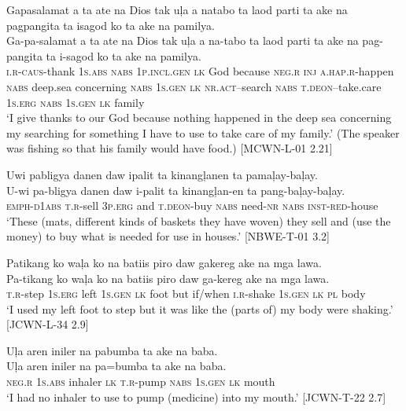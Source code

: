 \ea
Gapasalamat	a	ta	ate	na	Dios	tak	uļa a	natabo	ta	laod	parti	ta	ake	na	pagpangita ta	isagod	ko	ta	ake	na	pamilya. \\\smallskip
\gll Ga-pa-salamat	a	ta	ate	na	Dios	tak	uļa a	na-tabo	ta	laod	parti	ta	ake	na	pag-pangita ta	i-sagod	ko	ta	ake	na	pamilya. \\
\textsc{i.r}-\textsc{caus}-thank	1\textsc{s.abs}	\textsc{nabs}	1\textsc{p.incl.gen}	\textsc{lk}	God	because	\textsc{neg.r} \textsc{inj}	\textsc{a.hap.r}-happen	\textsc{nabs}	deep.sea	concerning	\textsc{nabs}	1\textsc{s.gen}	\textsc{lk}	\textsc{nr.act}–search \textsc{nabs}	\textsc{t.deon}–take.care	1\textsc{s.erg}	\textsc{nabs}	1\textsc{s.gen}	\textsc{lk}	family \\
\glt `I give thanks to our God because nothing happened in the deep sea concerning my searching for something I have to use to take care of my family.’ (The speaker was fishing so that his family would have food.) [MCWN-L-01 2.21]
\z

\ea
Uwi	pabligya	danen	daw	ipalit	ta	kinangļanen	ta	pamaļay-baļay. \\\smallskip
\gll U-wi	pa-bligya	danen	daw	i-palit	ta	kinangļan-en	ta	pang-baļay-baļay. \\
\textsc{emph-d1abs}	\textsc{t.r}-sell	3\textsc{p.erg}	and	\textsc{t.deon}-buy	\textsc{nabs}	need-\textsc{nr}	\textsc{nabs} \textsc{inst-red}-house \\
\glt ‘These (mats, different kinds of baskets they have woven) they sell and (use the money) to buy what is needed for use in houses.’ [NBWE-T-01 3.2]
\z

\ea
Patikang	ko	waļa	ko	na	batiis	piro	daw	gakereg ake	na	mga	lawa. \\\smallskip
\gll Pa-tikang	ko	waļa	ko	na	batiis	piro	daw	ga-kereg ake	na	mga	lawa. \\
\textsc{t.r}-step	1\textsc{s.erg}	left	1\textsc{s.gen}	\textsc{lk}	foot	but	if/when	\textsc{i.r}-shake 1\textsc{s.gen}	\textsc{lk}	\textsc{pl}	body \\
\glt ‘I used my left foot to step but it was like the (parts of) my body were shaking.' [JCWN-L-34 2.9]
\z

\ea
Uļa	aren	iniler	na	pabumba	ta	ake	na	baba. \\\smallskip
\gll Uļa	aren	iniler	na	pa=bumba	ta	ake	na	baba. \\
\textsc{neg.r}	1\textsc{s.abs}	inhaler	\textsc{lk}	\textsc{t.r}-pump	\textsc{nabs}	1\textsc{s.gen}	\textsc{lk}	mouth \\
\glt ‘I had no inhaler to use to pump (medicine) into my mouth.’ [JCWN-T-22 2.7]
\z

